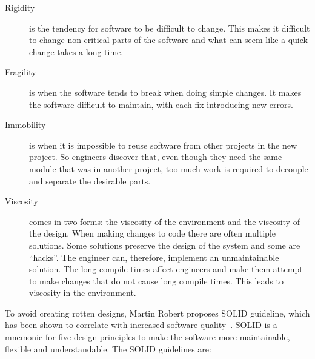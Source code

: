 \begin{description}

\item[ Rigidity ] is the tendency for software to be difficult to
change. This makes it difficult to change non-critical parts of the software and
what can seem like a quick change takes a long time.

\item[ Fragility ] is when the software tends to break when doing
simple changes. It makes the software difficult to maintain, with each fix
introducing new errors.

\item[ Immobility ] is when it is impossible to reuse software from
other projects in the new project. So engineers discover that, even though they
need the same module that was in another project, too much work is required to
decouple and separate the desirable parts.

\item[ Viscosity ] comes in two forms: the viscosity of the environment and the
    viscosity of the design. When making changes to code there are often
    multiple solutions. Some solutions preserve the design of the system and
    some are ``hacks''. The engineer can, therefore, implement an unmaintainable
    solution. The long compile times affect engineers and make them attempt to
    make changes that do not cause long compile times.  This leads to viscosity
    in the environment.

\end{description}

To avoid creating rotten designs, Martin Robert proposes SOLID guideline, which
has been shown to correlate with increased software
quality~\cite{singh2015effect}.  SOLID is a mnemonic for five design principles
to make the software more maintainable, flexible and understandable.  The SOLID
guidelines are:

